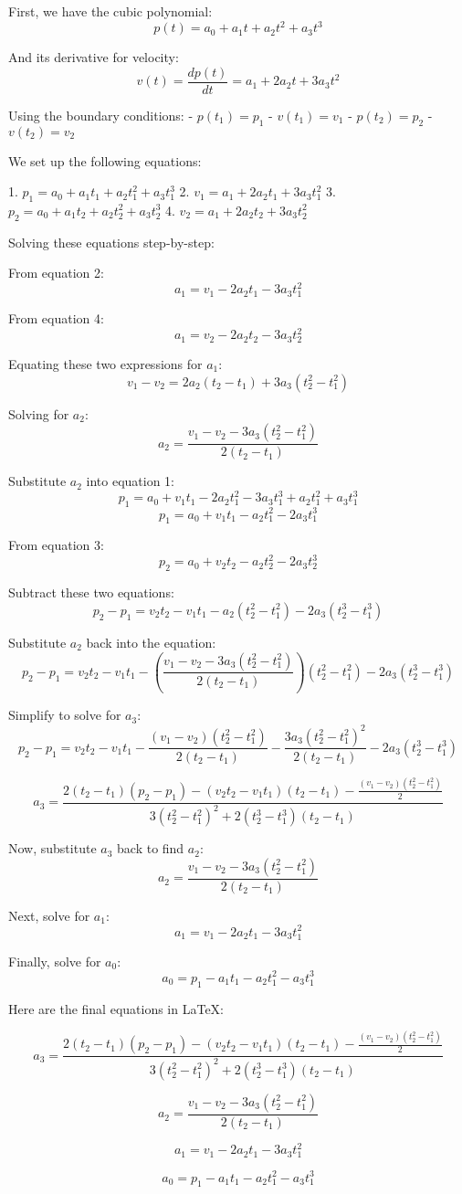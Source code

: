 \documentclass{article}
\begin{document}
First, we have the cubic polynomial:
\[ p(t) = a_0 + a_1 t + a_2 t^2 + a_3 t^3 \]

And its derivative for velocity:
\[ v(t) = \frac{dp(t)}{dt} = a_1 + 2a_2 t + 3a_3 t^2 \]

Using the boundary conditions:
- \( p(t_1) = p_1 \)
- \( v(t_1) = v_1 \)
- \( p(t_2) = p_2 \)
- \( v(t_2) = v_2 \)

We set up the following equations:

1. \( p_1 = a_0 + a_1 t_1 + a_2 t_1^2 + a_3 t_1^3 \)
2. \( v_1 = a_1 + 2a_2 t_1 + 3a_3 t_1^2 \)
3. \( p_2 = a_0 + a_1 t_2 + a_2 t_2^2 + a_3 t_2^3 \)
4. \( v_2 = a_1 + 2a_2 t_2 + 3a_3 t_2^2 \)

Solving these equations step-by-step:

From equation 2:
\[ a_1 = v_1 - 2a_2 t_1 - 3a_3 t_1^2 \]

From equation 4:
\[ a_1 = v_2 - 2a_2 t_2 - 3a_3 t_2^2 \]

Equating these two expressions for \( a_1 \):
\[ v_1 - v_2 = 2a_2 (t_2 - t_1) + 3a_3 (t_2^2 - t_1^2) \]

Solving for \( a_2 \):
\[ a_2 = \frac{v_1 - v_2 - 3a_3 (t_2^2 - t_1^2)}{2(t_2 - t_1)} \]

Substitute \( a_2 \) into equation 1:
\[ p_1 = a_0 + v_1 t_1 - 2a_2 t_1^2 - 3a_3 t_1^3 + a_2 t_1^2 + a_3 t_1^3 \]
\[ p_1 = a_0 + v_1 t_1 - a_2 t_1^2 - 2a_3 t_1^3 \]

From equation 3:
\[ p_2 = a_0 + v_2 t_2 - a_2 t_2^2 - 2a_3 t_2^3 \]

Subtract these two equations:
\[ p_2 - p_1 = v_2 t_2 - v_1 t_1 - a_2 (t_2^2 - t_1^2) - 2a_3 (t_2^3 - t_1^3) \]

Substitute \( a_2 \) back into the equation:
\[ p_2 - p_1 = v_2 t_2 - v_1 t_1 - \left(\frac{v_1 - v_2 - 3a_3 (t_2^2 - t_1^2)}{2(t_2 - t_1)}\right) (t_2^2 - t_1^2) - 2a_3 (t_2^3 - t_1^3) \]

Simplify to solve for \( a_3 \):
\[ p_2 - p_1 = v_2 t_2 - v_1 t_1 - \frac{(v_1 - v_2)(t_2^2 - t_1^2)}{2(t_2 - t_1)} - \frac{3a_3 (t_2^2 - t_1^2)^2}{2(t_2 - t_1)} - 2a_3 (t_2^3 - t_1^3) \]

\[ a_3 = \frac{2(t_2 - t_1)(p_2 - p_1) - (v_2 t_2 - v_1 t_1)(t_2 - t_1) - \frac{(v_1 - v_2)(t_2^2 - t_1^2)}{2}}{3(t_2^2 - t_1^2)^2 + 2(t_2^3 - t_1^3)(t_2 - t_1)} \]

Now, substitute \( a_3 \) back to find \( a_2 \):
\[ a_2 = \frac{v_1 - v_2 - 3a_3 (t_2^2 - t_1^2)}{2(t_2 - t_1)} \]

Next, solve for \( a_1 \):
\[ a_1 = v_1 - 2a_2 t_1 - 3a_3 t_1^2 \]

Finally, solve for \( a_0 \):
\[ a_0 = p_1 - a_1 t_1 - a_2 t_1^2 - a_3 t_1^3 \]

Here are the final equations in LaTeX:

\[
a_3 = \frac{2(t_2 - t_1)(p_2 - p_1) - (v_2 t_2 - v_1 t_1)(t_2 - t_1) - \frac{(v_1 - v_2)(t_2^2 - t_1^2)}{2}}{3(t_2^2 - t_1^2)^2 + 2(t_2^3 - t_1^3)(t_2 - t_1)}
\]

\[
a_2 = \frac{v_1 - v_2 - 3a_3 (t_2^2 - t_1^2)}{2(t_2 - t_1)}
\]

\[
a_1 = v_1 - 2a_2 t_1 - 3a_3 t_1^2
\]

\[
a_0 = p_1 - a_1 t_1 - a_2 t_1^2 - a_3 t_1^3
\]
\end{document}
